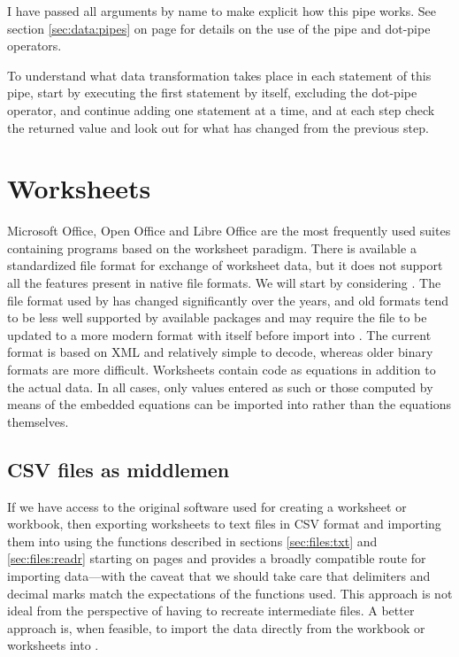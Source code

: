 \documentclass[krantz2]{krantz}\usepackage{knitr}
\begin{document}
I have passed all arguments by name to make explicit how this pipe works. See section \ref{sec:data:pipes} on page \pageref{sec:data:pipes} for details on the use of the pipe and dot-pipe operators.

\begin{playground}
  To understand what data transformation takes place in each statement of this pipe, start by executing the first statement by itself, excluding the dot-pipe operator, and continue adding one statement at a time, and at each step check the returned value and look out for what has changed from the previous step.
\end{playground}


\section{Worksheets}\label{sec:files:worksheets}

Microsoft Office, Open Office and Libre Office are the most frequently used suites containing programs based on the worksheet paradigm. There is available a standardized file format for exchange of worksheet data, but it does not support all the features present in native file formats. We will start by considering . The file format used by  has changed significantly over the years, and old formats tend to be less well supported by available \Rlang packages and may require the file to be updated to a more modern format with  itself before import into \Rlang. The current format is based on XML and relatively simple to decode, whereas older binary formats are more difficult. Worksheets contain code as equations in addition to the actual data. In all cases, only values entered as such or those computed by means of the embedded equations can be imported into \Rlang rather than the equations themselves.

\subsection{CSV files as middlemen}

If we have access to the original software used for creating a worksheet or workbook, then exporting worksheets to text files in CSV format and importing them into \Rlang using the functions described in sections \ref{sec:files:txt} and \ref{sec:files:readr} starting on pages \pageref{sec:files:txt} and \pageref{sec:files:readr} provides a broadly compatible route for importing data---with the caveat that we should take care that delimiters and decimal marks match the expectations of the functions used. This approach is not ideal from the perspective of having to recreate intermediate files. A better approach is, when feasible, to import the data directly from the workbook or worksheets into \Rlang.
\end{document}
